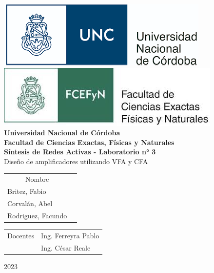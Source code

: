 \documentclass[12pt,A4paper,titlepage]{article}
\begin{document}
\begin{titlepage}

\thispagestyle{empty}



\begin{center}
    \includegraphics[scale=0.4]{Imagenes/unc_logo.png}
    \includegraphics[scale=0.4]{Imagenes/fcefyn_logo.jpg}
    \\[1cm]
    \vspace{5pt}
    \LARGE \textbf{Universidad Nacional de Córdoba}\\[0.5cm] 
    \large \textbf{Facultad de Ciencias Exactas, Físicas y Naturales} \\[0.5cm] 
    \large \textbf{Síntesis de Redes Activas - Laboratorio n° 3}
    \\[0.5cm]
    \large Diseño de amplificadores utilizando VFA y CFA
    \\[0.2cm] 
    \vspace{60pt}
    \begin{table}[!h]
    \centering
    \begin{tabular}{ll}
    \multicolumn{1}{c}{Nombre}  \\
    Britez, Fabio\\
    Corvalán, Abel\\
    Rodriguez, Facundo
    \end{tabular}
    \end{table}
    \vspace{20pt}
    \begin{table}[!h]
    \centering
    \begin{tabular}{ll}
    \multicolumn{1}{c}{Docentes} & Ing. Ferreyra Pablo \\ & Ing. César Reale \\
    \end{tabular}
    \end{table}
    \vspace{20pt}
    \large 2023
\end{center}

\end{titlepage}
\end{document}
